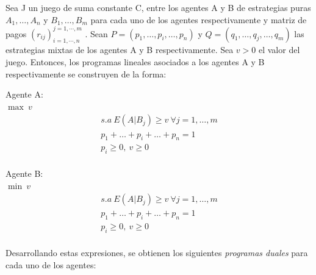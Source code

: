 \begin{proposicion}
Sea J un juego de suma constante C, entre los agentes A y B de estrategias puras $A_1,\ldots,A_n$ y $B_1,\ldots,B_m$ para cada uno de los agentes respectivamente y matriz de pagos $\left( r_{ij}\right)_{i=1, \cdots ,n}^{j=1, \cdots, m}$ . Sean $P=(p_1,\ldots,p_i,\ldots,p_n)$ y $Q=(q_1,\ldots,q_j,\ldots,q_m)$ las estrategias mixtas de los agentes A  y B respectivamente. Sea $v>0$ el valor del juego. Entonces, los programas lineales asociados a los agentes A y B respectivamente se construyen de la forma:\\

\begin{minipage}{0.45\textwidth}
Agente A:\\
$\max \: v$
    \begin{align*}
    s.a \: E(A|B_j) \geq v \: \forall j =1,\ldots,m \\
    p_1+\ldots+p_i+\ldots+p_n = 1 \\
    p_i \geq 0 , \:v \geq 0\\
    \end{align*}
\end{minipage}
\begin{minipage}{0.45\textwidth}
Agente B:\\
$\min \: v$
    \begin{align*}
    s.a \: E(A|B_j) \geq v \: \forall j =1,\ldots,m \\
    p_1+\ldots+p_i+\ldots+p_n = 1 \\
    p_i \geq 0 , \:v \geq 0\\
    \end{align*}
\end{minipage}

Desarrollando estas expresiones, se obtienen los siguientes \textit{programas duales} para cada uno de los agentes:\\


\end{proposicion}
